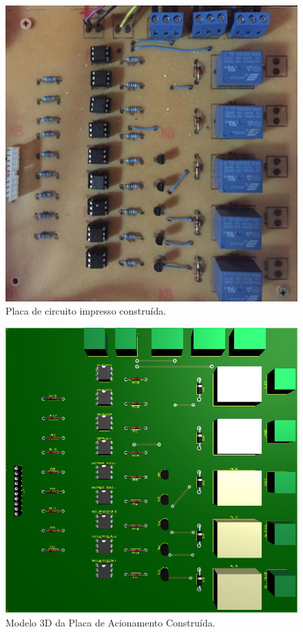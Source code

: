   \begin{figure}[htb]
	\caption{\label{placaPronta}Placa de circuito impresso construída.}
	\begin{center}
	    \includegraphics[width=0.55\linewidth]{./img/placaPronta.jpg}
	\end{center}
\end{figure}

\begin{figure}[htb]
	\caption{\label{PlacaAcionamento}Modelo 3D da Placa de Acionamento Construída.}
	\begin{center}
	    \includegraphics[width=0.45\linewidth]{./img/PlacadeAcionamentos.jpg}
	\end{center}
\end{figure}


